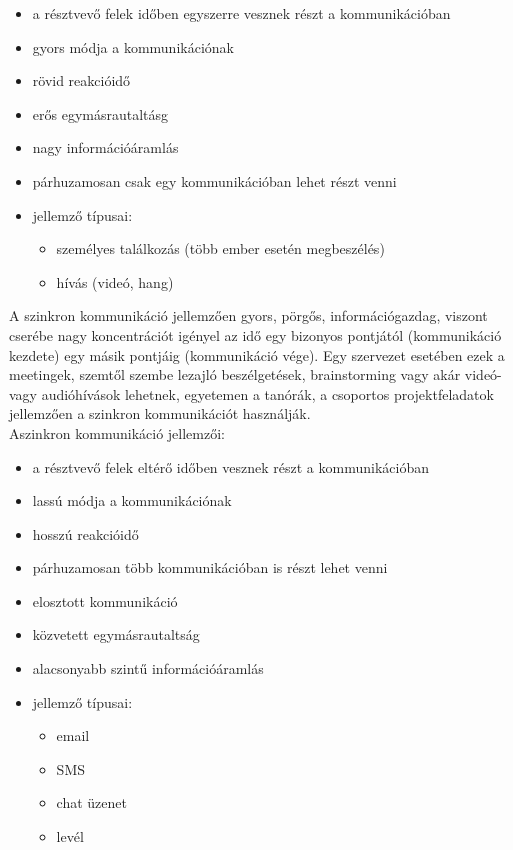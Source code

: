 \begin{itemize}
  \item a résztvevő felek időben egyszerre vesznek részt a kommunikációban
  \item gyors módja a kommunikációnak
  \item rövid reakcióidő
  \item erős egymásrautaltásg
  \item nagy információáramlás
  \item párhuzamosan csak egy kommunikációban lehet részt venni
  \item jellemző típusai:
  \begin{itemize}
    \item személyes találkozás (több ember esetén megbeszélés)
    \item hívás (videó, hang)
  \end{itemize}
\end{itemize}
A szinkron kommunikáció jellemzően gyors, pörgős, információgazdag, viszont cserébe nagy koncentrációt igényel az idő egy bizonyos pontjától (kommunikáció kezdete) egy másik pontjáig (kommunikáció vége). Egy szervezet esetében ezek a meetingek, szemtől szembe lezajló beszélgetések, brainstorming vagy akár videó- vagy audióhívások lehetnek, egyetemen a tanórák, a csoportos projektfeladatok jellemzően a szinkron kommunikációt használják.\\
\newline
Aszinkron kommunikáció jellemzői:
\begin{itemize}
  \item a résztvevő felek eltérő időben vesznek részt a kommunikációban
  \item lassú módja a kommunikációnak
  \item hosszú reakcióidő
  \item párhuzamosan több kommunikációban is részt lehet venni
  \item elosztott kommunikáció
  \item közvetett egymásrautaltság
  \item alacsonyabb szintű információáramlás
  \item jellemző típusai:
  \begin{itemize}
    \item email
    \item SMS
    \item chat üzenet
    \item levél
  \end{itemize}
\end{itemize}

